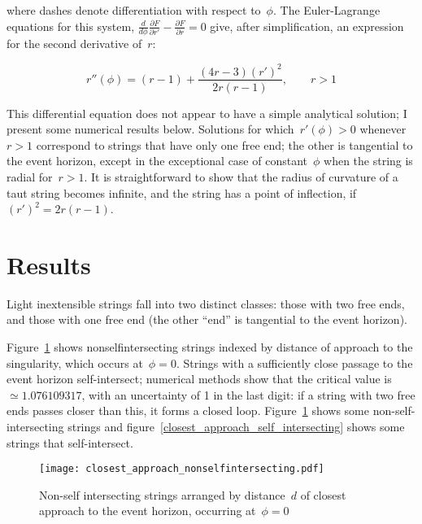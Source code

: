 \documentclass[times,twocolumn,final]{elsarticle}
\begin{document}
where dashes denote differentiation with respect to~$\phi$.  The
Euler-Lagrange equations for this system,
$\frac{d}{d\phi}\frac{\partial F}{\partial r'}-\frac{\partial
  F}{\partial r}=0$ give, after simplification, an expression for the
second derivative of~$r$:

\begin{equation}\label{rdashdash}
  r''\left(\phi\right) =
  (r-1) + \frac{(4r-3)\left(r'\right)^2}{2r\left(r-1\right)},\qquad r>1
\end{equation}

This differential equation does not appear to have a simple analytical
solution; I present some numerical results below.  Solutions for
which~$r'(\phi)>0$ whenever~$r>1$ correspond to strings that have only
one free end; the other is tangential to the event horizon, except in
the exceptional case of constant~$\phi$ when the string is radial
for~$r>1$.  It is straightforward to show that the radius of curvature
of a taut string becomes infinite, and the string has a point of
inflection, if~$\left(r'\right)^2=2r\left(r-1\right)$.

\section{Results}
Light inextensible strings fall into two distinct classes: those with
two free ends, and those with one free end (the other ``end'' is
tangential to the event horizon).  

Figure~\ref{closest_approach_non_self_intersecting} shows
nonselfintersecting strings indexed by distance of approach to the
singularity, which occurs at~$\phi=0$.  Strings with a sufficiently
close passage to the event horizon self-intersect; numerical methods
show that the critical value is~$\simeq 1.076109317$, with an
uncertainty of 1 in the last digit: if a string with two free ends
passes closer than this, it forms a closed loop.
Figure~\ref{closest_approach_non_self_intersecting} shows some
non-self-intersecting strings and
figure~\ref{closest_approach_self_intersecting} shows some strings
that self-intersect.

\begin{figure}[h!]
\centering
\texttt{[image: closest\_approach\_nonselfintersecting.pdf]}
\caption{Non-self intersecting strings arranged by distance~$d$ of
  closest approach to the event horizon, occurring at~$\phi=0$}
\label{closest_approach_non_self_intersecting}
\end{figure}
\end{document}
